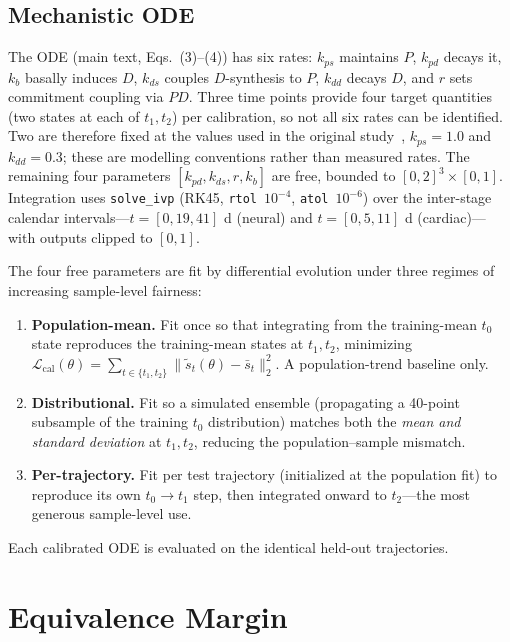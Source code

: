 \documentclass[10pt,journal,compsoc]{IEEEtran}
\begin{document}
\subsection{Mechanistic ODE}
The ODE (main text, Eqs.~(3)--(4)) has six rates: $k_{ps}$ maintains $P$, $k_{pd}$ decays it, $k_b$ basally induces $D$, $k_{ds}$ couples $D$-synthesis to $P$, $k_{dd}$ decays $D$, and $r$ sets commitment coupling via $PD$. Three time points provide four target quantities (two states at each of $t_1,t_2$) per calibration, so not all six rates can be identified. Two are therefore fixed at the values used in the original study~\cite{kanu2026transformer}, $k_{ps}{=}1.0$ and $k_{dd}{=}0.3$; these are modelling conventions rather than measured rates. The remaining four parameters $[k_{pd},k_{ds},r,k_b]$ are free, bounded to $[0,2]^3\times[0,1]$. Integration uses \texttt{solve\_ivp} (RK45, \texttt{rtol}~$10^{-4}$, \texttt{atol}~$10^{-6}$) over the inter-stage calendar intervals---$t=[0,19,41]$ d (neural) and $t=[0,5,11]$ d (cardiac)---with outputs clipped to $[0,1]$.

The four free parameters are fit by differential evolution under three regimes of increasing sample-level fairness:
\begin{enumerate}
    \item \textbf{Population-mean.} Fit once so that integrating from the training-mean $t_0$ state reproduces the training-mean states at $t_1,t_2$, minimizing $\mathcal{L}_{\mathrm{cal}}(\theta)=\sum_{t\in\{t_1,t_2\}}\lVert\tilde{s}_t(\theta)-\bar{s}_t\rVert_2^2$. A population-trend baseline only.
    \item \textbf{Distributional.} Fit so a simulated ensemble (propagating a 40-point subsample of the training $t_0$ distribution) matches both the \emph{mean and standard deviation} at $t_1,t_2$, reducing the population--sample mismatch.
    \item \textbf{Per-trajectory.} Fit per test trajectory (initialized at the population fit) to reproduce its own $t_0\!\rightarrow\!t_1$ step, then integrated onward to $t_2$---the most generous sample-level use.
\end{enumerate}
Each calibrated ODE is evaluated on the identical held-out trajectories.

\section{Equivalence Margin}
\label{sup:margin}
\end{document}
